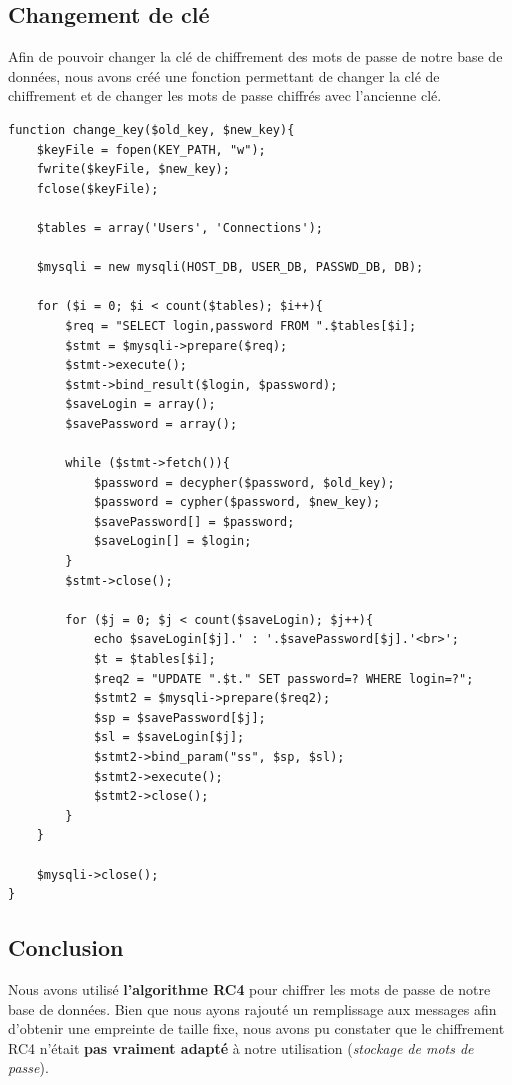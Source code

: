 \documentclass[12pt, a4paper]{article}
\begin{document}
\subsection{Changement de clé}

Afin de pouvoir changer la clé de chiffrement des mots de passe de notre base de données,
nous avons créé une fonction permettant de changer la clé de chiffrement
et de changer les mots de passe chiffrés avec l'ancienne clé.

\begin{lstlisting}[name=Fonction de changement de clé]
function change_key($old_key, $new_key){
    $keyFile = fopen(KEY_PATH, "w");
    fwrite($keyFile, $new_key);
    fclose($keyFile);

    $tables = array('Users', 'Connections');
    
    $mysqli = new mysqli(HOST_DB, USER_DB, PASSWD_DB, DB);

    for ($i = 0; $i < count($tables); $i++){
        $req = "SELECT login,password FROM ".$tables[$i];
        $stmt = $mysqli->prepare($req);
        $stmt->execute();
        $stmt->bind_result($login, $password);
        $saveLogin = array();
        $savePassword = array();

        while ($stmt->fetch()){
            $password = decypher($password, $old_key);
            $password = cypher($password, $new_key);
            $savePassword[] = $password;
            $saveLogin[] = $login;
        }
        $stmt->close();

        for ($j = 0; $j < count($saveLogin); $j++){
            echo $saveLogin[$j].' : '.$savePassword[$j].'<br>';
            $t = $tables[$i];
            $req2 = "UPDATE ".$t." SET password=? WHERE login=?";
            $stmt2 = $mysqli->prepare($req2);
            $sp = $savePassword[$j];
            $sl = $saveLogin[$j];
            $stmt2->bind_param("ss", $sp, $sl);
            $stmt2->execute();
            $stmt2->close();
        }
    }

    $mysqli->close();
}
\end{lstlisting}

\subsection*{Conclusion}

Nous avons utilisé \textbf{l'algorithme RC4} pour chiffrer les mots de passe de notre base de données.
Bien que nous ayons rajouté un remplissage aux messages afin d'obtenir une empreinte de taille fixe,
nous avons pu constater que le chiffrement RC4 n'était \textbf{pas vraiment adapté} à notre utilisation (\textit{stockage de mots de passe}).
\end{document}
